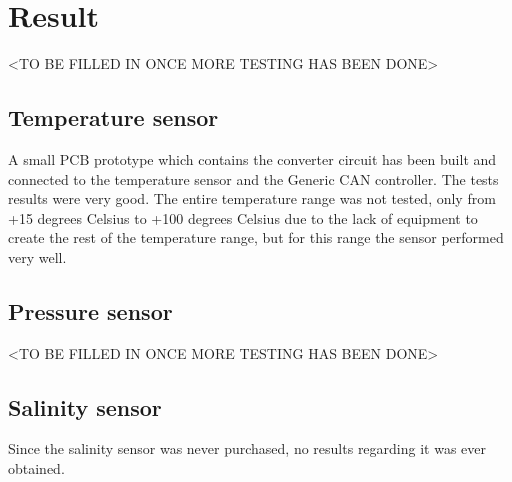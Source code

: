 
\section{Result}\label{sec:result}
<TO BE FILLED IN ONCE MORE TESTING HAS BEEN DONE>

\subsection{Temperature sensor}
A small PCB prototype which contains the converter circuit has been built and connected to the temperature sensor and the Generic CAN controller. The tests results were very good. The entire temperature range was not tested, only from +15 degrees Celsius to +100 degrees Celsius due to the lack of equipment to create the rest of the temperature range, but for this range the sensor performed very well. 

\subsection{Pressure sensor}
<TO BE FILLED IN ONCE MORE TESTING HAS BEEN DONE>

\subsection{Salinity sensor}
Since the salinity sensor was never purchased, no results regarding it was ever obtained.

